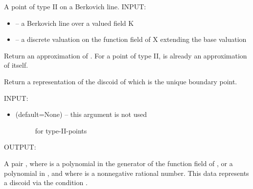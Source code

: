 \documentclass[letterpaper,10pt,english]{sphinxmanual}
\begin{document}
\begin{fulllineitems}
\label{berkovich_line:mclf.berkovich.berkovich_line.TypeIIPointOnBerkovichLine}
A point of type II on a Berkovich line.
INPUT:
\begin{itemize}
\item {} 
 -- a Berkovich line over a valued field K

\item {} 
 -- a discrete valuation on the function field of X extending the base valuation

\end{itemize}

\begin{fulllineitems}
\label{berkovich_line:mclf.berkovich.berkovich_line.TypeIIPointOnBerkovichLine.approximation}
Return an approximation of .
For a point of type II,  is already an approximation of itself.

\end{fulllineitems}


\begin{fulllineitems}
\label{berkovich_line:mclf.berkovich.berkovich_line.TypeIIPointOnBerkovichLine.discoid}
Return a representation of the discoid of which  is the
unique boundary point.

INPUT:
\begin{itemize}
\item {} \begin{description}
\item[{ (default=None) -- this argument is not used}] \leavevmode
for type-II-points

\end{description}

\end{itemize}

OUTPUT:

A pair , where  is a polynomial in the generator  of the
function field of , or a polynomial in , and where  is a
nonnegative rational number. This data represents a discoid  via
the condition .


\end{fulllineitems}
\end{fulllineitems}
\end{document}
